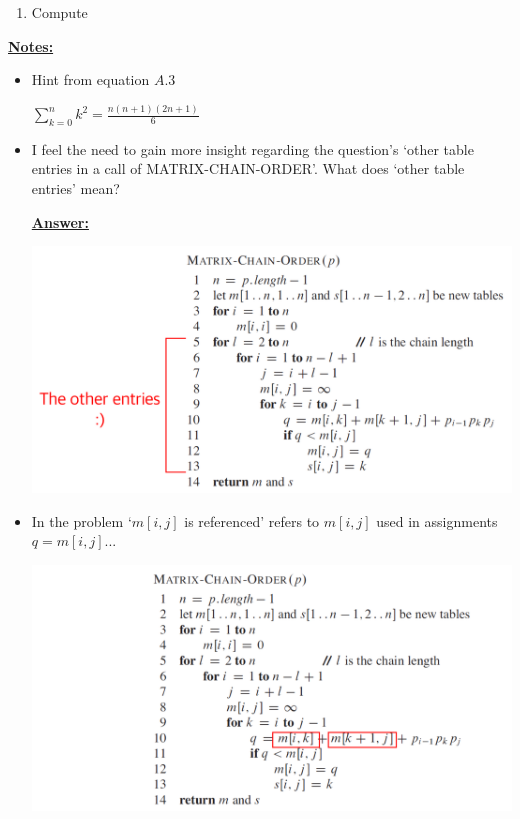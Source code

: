 \documentclass[12pt]{article}
\begin{document}
\begin{enumerate}[1.]
\begin{enumerate}[1.]
\begin{itemize}
\begin{mdframed}
            \end{mdframed}
        \end{itemize}

        \item Compute

    \end{enumerate}

    \bigskip

    \underline{\textbf{Notes:}}

    \bigskip

    \begin{itemize}
        \item Hint from equation $A.3$

        \bigskip

        $\sum\limits_{k=0}^n k^2 = \frac{n(n+1)(2n+1)}{6}$

        \item I feel the need to gain more insight regarding the question's `other table
        entries in a call of MATRIX-CHAIN-ORDER'. What does `other table entries' mean?

        \bigskip

        \underline{\textbf{Answer:}}

        \begin{center}
        \includegraphics[width=\linewidth]{images/worksheet_3_solution_6.png}
        \end{center}

        \item In the problem `$m[i,j]$ is referenced' refers to $m[i,j]$ used in assignments $q = m[i,j] ...$

        \begin{center}
        \includegraphics[width=\linewidth]{images/worksheet_3_solution_7.png}
        \end{center}



\end{itemize}
\end{enumerate}
\end{document}
